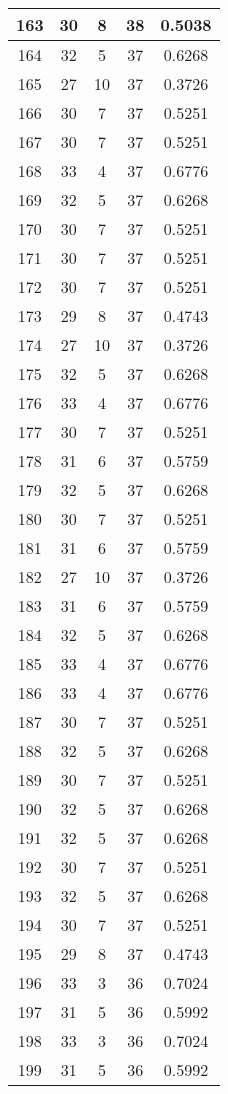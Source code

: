 \documentclass[letterpaper, 12pt]{article}
\begin{document}
\begin{longtable}{|c|c|c|c|c|}
\hline
163 & 30 & 8 & 38 & 0.5038 \\
\hline
164 & 32 & 5 & 37 & 0.6268 \\
\hline
165 & 27 & 10 & 37 & 0.3726 \\
\hline
166 & 30 & 7 & 37 & 0.5251 \\
\hline
167 & 30 & 7 & 37 & 0.5251 \\
\hline
168 & 33 & 4 & 37 & 0.6776 \\
\hline
169 & 32 & 5 & 37 & 0.6268 \\
\hline
170 & 30 & 7 & 37 & 0.5251 \\
\hline
171 & 30 & 7 & 37 & 0.5251 \\
\hline
172 & 30 & 7 & 37 & 0.5251 \\
\hline
173 & 29 & 8 & 37 & 0.4743 \\
\hline
174 & 27 & 10 & 37 & 0.3726 \\
\hline
175 & 32 & 5 & 37 & 0.6268 \\
\hline
176 & 33 & 4 & 37 & 0.6776 \\
\hline
177 & 30 & 7 & 37 & 0.5251 \\
\hline
178 & 31 & 6 & 37 & 0.5759 \\
\hline
179 & 32 & 5 & 37 & 0.6268 \\
\hline
180 & 30 & 7 & 37 & 0.5251 \\
\hline
181 & 31 & 6 & 37 & 0.5759 \\
\hline
182 & 27 & 10 & 37 & 0.3726 \\
\hline
183 & 31 & 6 & 37 & 0.5759 \\
\hline
184 & 32 & 5 & 37 & 0.6268 \\
\hline
185 & 33 & 4 & 37 & 0.6776 \\
\hline
186 & 33 & 4 & 37 & 0.6776 \\
\hline
187 & 30 & 7 & 37 & 0.5251 \\
\hline
188 & 32 & 5 & 37 & 0.6268 \\
\hline
189 & 30 & 7 & 37 & 0.5251 \\
\hline
190 & 32 & 5 & 37 & 0.6268 \\
\hline
191 & 32 & 5 & 37 & 0.6268 \\
\hline
192 & 30 & 7 & 37 & 0.5251 \\
\hline
193 & 32 & 5 & 37 & 0.6268 \\
\hline
194 & 30 & 7 & 37 & 0.5251 \\
\hline
195 & 29 & 8 & 37 & 0.4743 \\
\hline
196 & 33 & 3 & 36 & 0.7024 \\
\hline
197 & 31 & 5 & 36 & 0.5992 \\
\hline
198 & 33 & 3 & 36 & 0.7024 \\
\hline
199 & 31 & 5 & 36 & 0.5992 \\
\hline
\end{longtable}
\end{document}
